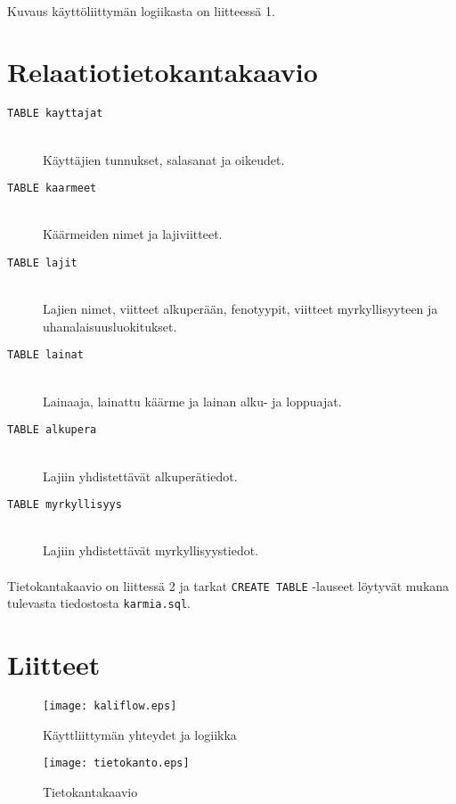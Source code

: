 \documentclass[11pt]{article}
\begin{document}
\paragraph{} Kuvaus käyttöliittymän logiikasta on liitteessä 1.

\section{Relaatiotietokantakaavio}

\begin{description}
\item[\large \texttt{TABLE kayttajat}] \hfill \\
Käyttäjien tunnukset, salasanat ja oikeudet.
\item[\large \texttt{TABLE kaarmeet}] \hfill \\
Käärmeiden nimet ja lajiviitteet.
\item[\large \texttt{TABLE lajit}] \hfill \\
Lajien nimet, viitteet alkuperään, fenotyypit, viitteet myrkyllisyyteen ja uhanalaisuusluokitukset.
\item[\large \texttt{TABLE lainat}] \hfill \\
Lainaaja, lainattu käärme ja lainan alku- ja loppuajat.
\item[\large \texttt{TABLE alkupera}] \hfill \\
Lajiin yhdistettävät alkuperätiedot.
\item[\large \texttt{TABLE myrkyllisyys}] \hfill \\
Lajiin yhdistettävät myrkyllisyystiedot.
\end{description}

\paragraph{} Tietokantakaavio on liittessä 2 ja tarkat \texttt{CREATE TABLE} -lauseet löytyvät mukana tulevasta tiedostosta \texttt{karmia.sql}.

\newpage

\section{Liitteet}

\begin{figure}[h]
\caption{Käyttliittymän yhteydet ja logiikka}
\texttt{[image: kaliflow.eps]}
\end{figure}

\begin{figure}
\caption{Tietokantakaavio}
\texttt{[image: tietokanto.eps]}
\end{figure}
\end{document}
